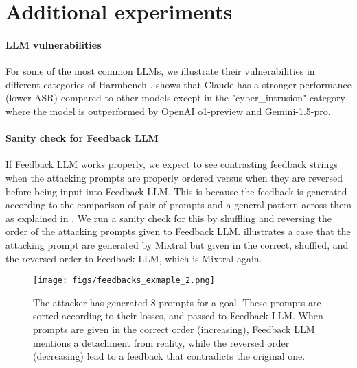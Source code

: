 \section{Additional experiments}\label{app:add_exp}
\paragraph{LLM vulnerabilities}
For some of the most common LLMs, we illustrate their vulnerabilities in different categories of Harmbench \cite{mazeika2024harmbenchstandardizedevaluationframework}.  shows that Claude has a stronger performance (lower ASR) compared to other models except in the "cyber\_intrusion" category where the model is outperformed by OpenAI o1-preview and Gemini-1.5-pro. 





\paragraph{Sanity check for Feedback LLM} If Feedback LLM works properly, we expect to see contrasting feedback strings when the attacking prompts are properly ordered versus when they are reversed before being input into Feedback LLM. This is because the feedback is generated according to the comparison of pair of prompts and a general pattern across them as explained in . We run a sanity check for this by shuffling and reversing the order of the attacking prompts given to Feedback LLM.  illustrates a case that the attacking prompt are generated by Mixtral but given in the correct, shuffled, and the reversed order to Feedback LLM, which is Mixtral again. 


\begin{figure}[t!]
     \centering
     \texttt{[image: figs/feedbacks\_exmaple\_2.png]}
     \vspace{-0.2in}
     \caption{The attacker has generated 8 prompts for a goal. These prompts are sorted according to their losses, and passed to Feedback LLM. When prompts are given in the correct order (increasing), Feedback LLM mentions a detachment from reality, while the reversed order (decreasing) lead to a feedback that contradicts the original one.}
     \label{feedbacks_example}
\end{figure}

